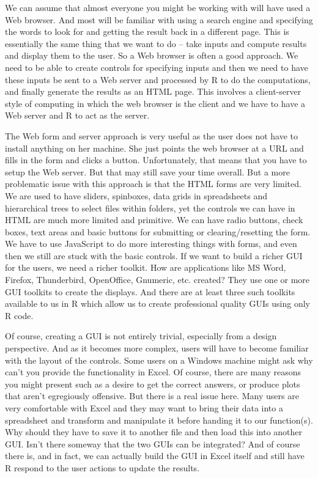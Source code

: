 We can assume that almost everyone you might be working with will have
used a Web browser. %
And most will be familiar with using a search engine and specifying
the words to look for and getting the result back in a different page.
This is essentially the same thing that we want to do -- take inputs
and compute results and display them to the user.  So a Web browser is
often a good approach.  We need to be able to create controls for
specifying inputs and then we need to have these inputs be sent to a
Web server and processed by R to do the computations, and finally
generate the results as an HTML page.  This involves a client-server
style of computing in which the web browser is the client and we have
to have a Web server and R to act as the server.

The Web form and server approach is very useful as the user does not
have to install anything on her machine.  She just points the web
browser at a URL and fills in the form and clicks a button.
Unfortunately, that means that you have to setup the Web server. But
that may still save your time overall.  But a more problematic issue
with this approach is that the HTML forms are very limited.  We are
used to have sliders, spinboxes, data grids in spreadsheets and
hierarchical trees to select files within folders, yet the controls we
can have in HTML are much more limited and primitive.  We can have
radio buttons, check boxes, text areas and basic buttons for
submitting or clearing/resetting the form.  We have to use JavaScript
to do more interesting things with forms, and even then we still are
stuck with the basic controls.  If we want to build a richer GUI for
the users, we need a richer toolkit.  How are applications like MS
Word, Firefox, Thunderbird, OpenOffice, Gnumeric, etc. created? They
use one or more GUI toolkits to create the displays.  And there are at
least three such toolkits available to us in R which allow us to
create professional quality GUIs using only R code.

Of course, creating a GUI is not entirely trivial, especially from a
design perspective. And as it becomes more complex, users will have to
become familiar with the layout of the controls.  Some users on a
Windows machine might ask why can't you provide the functionality in
Excel. Of course, there are many reasons you might present such as a
desire to get the correct answers, or produce plots that aren't
egregiously offensive.  But there is a real issue here.  Many users
are very comfortable with Excel and they may want to bring their data
into a spreadsheet and transform and manipulate it before handing it
to our function(s).  Why should they have to save it to another file
and then load this into another GUI. Isn't there someway that the two
GUIs can be integrated?  And of course there is, and in fact, we can
actually build the GUI in Excel itself and still have R respond to the
user actions to update the results.

